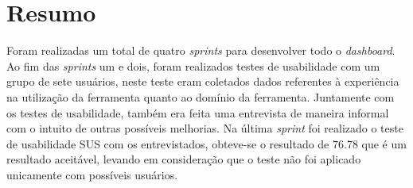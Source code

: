 \section{Resumo}
Foram realizadas um total de quatro \textit{sprints} para desenvolver todo o \textit{dashboard}. Ao fim das \textit{sprints} um e dois, foram realizados testes de usabilidade com um grupo de sete usuários, neste teste eram coletados dados referentes à experiência na utilização da ferramenta quanto ao domínio da ferramenta. Juntamente com os testes de usabilidade, também era feita uma entrevista de maneira informal com o intuito de outras possíveis melhorias. Na última \textit{sprint} foi realizado o teste de usabilidade SUS com os entrevistados, obteve-se o resultado de 76.78 que é um resultado aceitável, levando em consideração que o teste não foi aplicado unicamente com possíveis usuários.